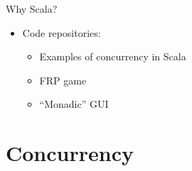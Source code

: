 \documentclass[presentation, 9pt]{beamer}\mode<presentation>{\usetheme{AMSBolognaFC}}
\begin{document}
\begin{frame}{Why Scala?}
\begin{itemize}
\begin{enumerate}
		\end{enumerate}
	\end{itemize}
	\begin{itemize}
		\item Code repositories:
		\begin{itemize}
			\item Examples of concurrency in Scala \href{https://github.com/cric96/scala-concurrent-programming}{\faLink}
   		\item FRP game \href{https://github.com/cric96/scala-frp-gui}{\faLink}
     	\item ``Monadic'' GUI \href{https://github.com/cric96/scala-functional-gui}{\faLink}  
		\end{itemize}
	\end{itemize}
\end{frame}
\section{Concurrency}
\end{document}
